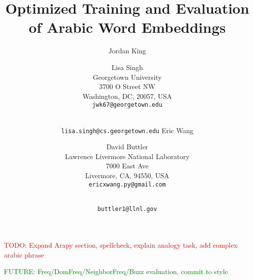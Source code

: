 \documentclass[11pt]{article}
\title{Optimized Training and Evaluation of Arabic Word Embeddings}
\author{Jordan King \and Lisa Singh\\
	    Georgetown University\\
	    3700 O Street NW\\
	    Washington, DC, 20057, USA\\
	    {\tt jwk67@georgetown.edu} \and\\
	    {\tt lisa.singh@cs.georgetown.edu}
	  \And
		Eric Wang \and David Buttler\\
	    Lawrence Livermore National Laboratory\\
	    7000 East Ave\\
	    Livermore, CA, 94550, USA\\
	    {\tt ericxwang.py@gmail.com} \and\\
	    {\tt buttler1@llnl.gov}
	    }
\date{}
\begin{document}
\maketitle

\textcolor{red}{TODO: Expand Arapy section, spellcheck, explain analogy task, add complex arabic phrase}

\textcolor{green}{FUTURE: Freq/DomFreq/NeighborFreq/Buzz evaluation, commit to style}















\end{document}
